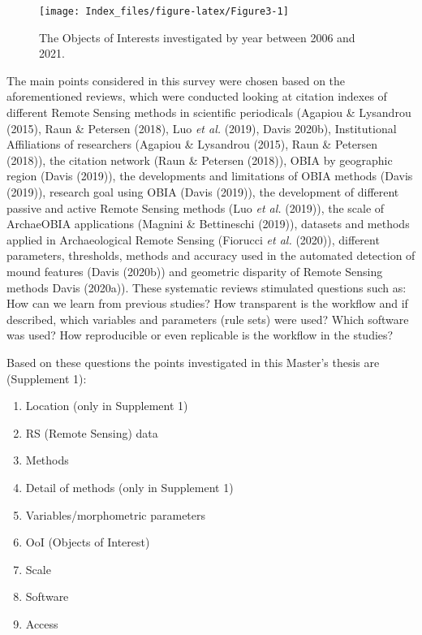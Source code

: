 \documentclass[
  12pt,
]{article}
\providecommand{\tightlist}{%
  \setlength{\itemsep}{0pt}\setlength{\parskip}{0pt}}
\begin{document}
\begin{figure}

{\centering \texttt{[image: Index\_files/figure-latex/Figure3-1]} 

}

\caption{The Objects of Interests investigated by year between 2006 and 2021.}\label{fig:Figure3}
\end{figure}

The main points considered in this survey were chosen based on the aforementioned reviews, which were conducted looking at citation indexes of different Remote Sensing methods in scientific periodicals (Agapiou \& Lysandrou (2015), Raun \& Petersen (2018), Luo \emph{et al.} (2019), Davis 2020b), Institutional Affiliations of researchers (Agapiou \& Lysandrou (2015), Raun \& Petersen (2018)), the citation network (Raun \& Petersen (2018)), OBIA by geographic region (Davis (2019)), the developments and limitations of OBIA methods (Davis (2019)), research goal using OBIA (Davis (2019)), the development of different passive and active Remote Sensing methods (Luo \emph{et al.} (2019)), the scale of ArchaeOBIA applications (Magnini \& Bettineschi (2019)), datasets and methods applied in Archaeological Remote Sensing (Fiorucci \emph{et al.} (2020)), different parameters, thresholds, methods and accuracy used in the automated detection of mound features (Davis (2020b)) and geometric disparity of Remote Sensing methods Davis (2020a)).
These systematic reviews stimulated questions such as: How can we learn from previous studies? How transparent is the workflow and if described, which variables and parameters (rule sets) were used? Which software was used? How reproducible or even replicable is the workflow in the studies?

Based on these questions the points investigated in this Master's thesis are (Supplement 1):

\begin{enumerate}
\def\labelenumi{(\roman{enumi})}
\tightlist
\item
  Location (only in Supplement 1)
\item
  RS (Remote Sensing) data
\item
  Methods
\item
  Detail of methods (only in Supplement 1)
\item
  Variables/morphometric parameters
\item
  OoI (Objects of Interest)
\item
  Scale
\item
  Software
\item
  Access
\end{enumerate}
\end{document}
